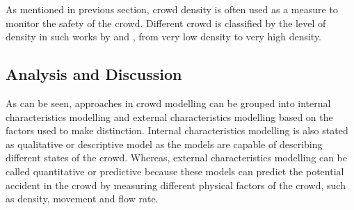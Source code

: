As mentioned in previous section, crowd density is often used as a measure to monitor the safety of the crowd. Different crowd is classified by the level of density in such works by \citet{Marana1997} and \citet{Weppner2013}, from very low density to very high density.

\subsection{Analysis and Discussion}

As can be seen, approaches in crowd modelling can be grouped into internal characteristics modelling and external characteristics modelling based on the factors used to make distinction. Internal characteristics modelling is also stated as qualitative or descriptive model \citep{Petty2004} as the models are capable of describing different states of the crowd. Whereas, external characteristics modelling can be called quantitative or predictive because these models can predict the potential accident in the crowd by measuring different physical factors of the crowd, such as density, movement and flow rate.

